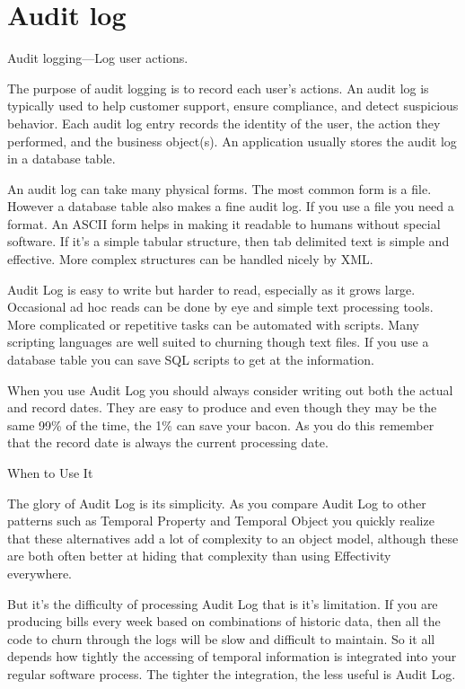 \section{Audit log} 

Audit logging—Log user actions.

The purpose of audit logging is to record each user’s actions. An audit log is typically
used to help customer support, ensure compliance, and detect suspicious behavior.
Each audit log entry records the identity of the user, the action they performed, and
the business object(s). An application usually stores the audit log in a database table.~\citep{richardson2018microservices}


An audit log can take many physical forms. The most common form is a file. However a database table also makes a fine audit log. If you use a file you need a format. An ASCII form helps in making it readable to humans without special software. If it's a simple tabular structure, then tab delimited text is simple and effective. More complex structures can be handled nicely by XML.

Audit Log is easy to write but harder to read, especially as it grows large. Occasional ad hoc reads can be done by eye and simple text processing tools. More complicated or repetitive tasks can be automated with scripts. Many scripting languages are well suited to churning though text files. If you use a database table you can save SQL scripts to get at the information.

When you use Audit Log you should always consider writing out both the actual and record dates. They are easy to produce and even though they may be the same 99\% of the time, the 1\% can save your bacon. As you do this remember that the record date is always the current processing date.

When to Use It

The glory of Audit Log is its simplicity. As you compare Audit Log to other patterns such as Temporal Property and Temporal Object you quickly realize that these alternatives add a lot of complexity to an object model, although these are both often better at hiding that complexity than using Effectivity everywhere.

But it's the difficulty of processing Audit Log that is it's limitation. If you are producing bills every week based on combinations of historic data, then all the code to churn through the logs will be slow and difficult to maintain. So it all depends how tightly the accessing of temporal information is integrated into your regular software process. The tighter the integration, the less useful is Audit Log.

